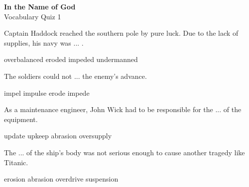 \documentclass{exam}
\begin{document}
\begin{center}
\textbf{In the Name of God}\\ 
Vocabulary Quiz 1
\end{center}
\vspace{5mm}
\begin{questions}

\question Captain Haddock reached the southern pole by pure luck. Due to the lack of supplies, his navy was ... .\\
\begin{oneparchoices}
\choice overbalanced 
 \choice eroded
 \choice impeded 
 \correctchoice undermanned
\end{oneparchoices}
\question The soldiers could not ... the enemy's advance.\\
\begin{oneparchoices}
 \choice impel
 \choice impulse
 \choice erode 
 \correctchoice impede
\end{oneparchoices}
\question As a maintenance engineer, John Wick had to be responsible for the ... of the equipment.\\
\begin{oneparchoices}
\choice update 
\correctchoice upkeep
 \choice abrasion 
 \choice oversupply 
\end{oneparchoices}

\question The ... of the ship's body was not serious enough to cause another tragedy like Titanic.\\
\begin{oneparchoices} 
\correctchoice erosion
 \choice abrasion 
 \choice overdrive
 \choice suspension
\end{oneparchoices}


\end{questions}
\end{document}
